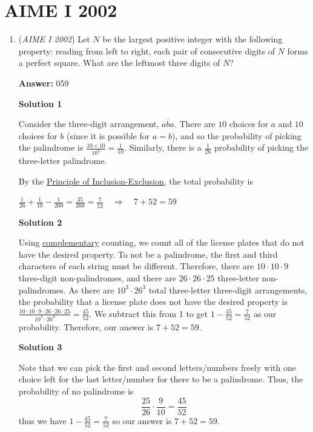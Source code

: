 \section{AIME I 2002}
        \begin{enumerate}
        	\item (\textit{AIME I 2002}) Let $N$ be the largest positive integer with the following property: reading from left to right, each pair of consecutive digits of $N$ forms a perfect square. What are the leftmost three digits of $N$?


 
 \textbf{Answer: }059



\textbf{Solution 1}

Consider the three-digit arrangement, $\overline{aba}$. There are $10$ choices for $a$ and $10$ choices for $b$ (since it is possible for $a=b$), and so the probability of picking the palindrome is $\frac{10 \times 10}{10^3} = \frac 1{10}$. Similarly, there is a $\frac 1{26}$ probability of picking the three-letter palindrome.  

 By the \href{https://artofproblemsolving.com/wiki/index.php?title=Principle\_of\_Inclusion-Exclusion}{Principle of Inclusion-Exclusion}, the total probability is

 $\frac{1}{26}+\frac{1}{10}-\frac{1}{260}=\frac{35}{260}=\frac{7}{52}\quad\Longrightarrow\quad7+52=\boxed{59}$




\textbf{Solution 2}

Using \href{https://artofproblemsolving.com/wiki/index.php?title=Complementary}{complementary} counting, we count all of the license plates that do not have the desired property.  To not be a palindrome, the first and third characters of each string must be different.  Therefore, there are $10\cdot 10\cdot 9$ three-digit non-palindromes, and there are $26\cdot 26\cdot 25$ three-letter non-palindromes.  As there are $10^3\cdot 26^3$ total three-letter three-digit arrangements, the probability that a license plate does not have the desired property is $\frac{10\cdot 10\cdot 9\cdot 26\cdot 26\cdot 25}{10^3\cdot 26^3}=\frac{45}{52}$.  We subtract this from 1 to get $1-\frac{45}{52}=\frac{7}{52}$ as our probability.  Therefore, our answer is $7+52=\boxed{59}$.

 



\textbf{Solution 3}

Note that we can pick the first and second letters/numbers freely with one choice left for the last letter/number for there to be a palindrome. Thus, the probability of no palindrome is 
 \[\frac{25}{26}\cdot \frac{9}{10}=\frac{45}{52}\] thus we have $1-\frac{45}{52}=\frac{7}{52}$ so our answer is $7+52 = \boxed{59}.$





\end{enumerate}
